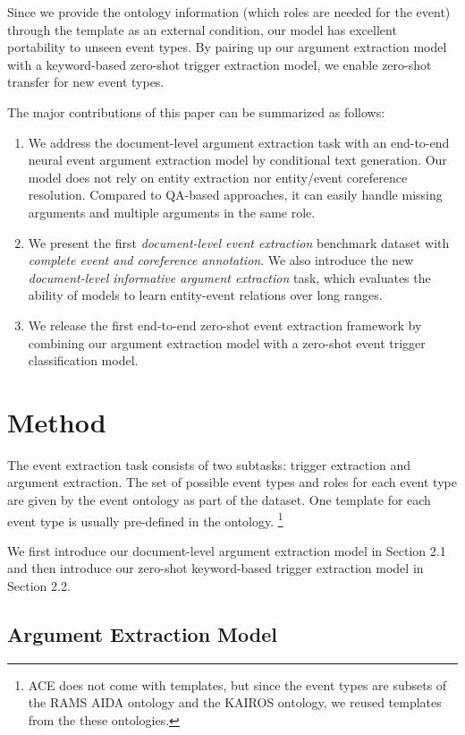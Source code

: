 Since we provide the ontology information (which roles are needed for the event) through the template as an external condition, our model has excellent portability to unseen event types.  By pairing up our argument extraction model with a keyword-based zero-shot trigger extraction model, we enable zero-shot transfer for new event types.

The major contributions of this paper can be summarized as follows:

\begin{enumerate}
    \item We address the  document-level argument extraction task with an end-to-end neural event argument extraction model by conditional text generation. Our model does not rely on entity extraction nor entity/event coreference resolution. Compared to QA-based approaches, it can easily handle missing arguments and multiple arguments in the same role.
    \item We present the first \textit{document-level event extraction} benchmark dataset with \textit{complete event and coreference annotation}. We also introduce the new \textit{document-level informative argument extraction} task, which evaluates the ability of models to learn entity-event relations over long ranges.
    \item We release the first end-to-end zero-shot event extraction framework by combining our argument extraction model with a zero-shot event trigger classification model. %
\end{enumerate}

\section{Method}
\vspace{-0.2cm}
The event extraction task consists of two subtasks: trigger extraction and argument extraction. 
The set of possible event types and roles for each event type are given by the event ontology as part of the dataset. One  template for each event type is usually pre-defined in the ontology. \footnote{ACE does not come with templates, but since the event types are subsets of the RAMS AIDA ontology and the KAIROS ontology, we reused templates from the these ontologies.}

We first introduce our document-level argument extraction model in Section 2.1 and then introduce our zero-shot keyword-based trigger extraction model in Section 2.2.

\subsection{Argument Extraction Model}

